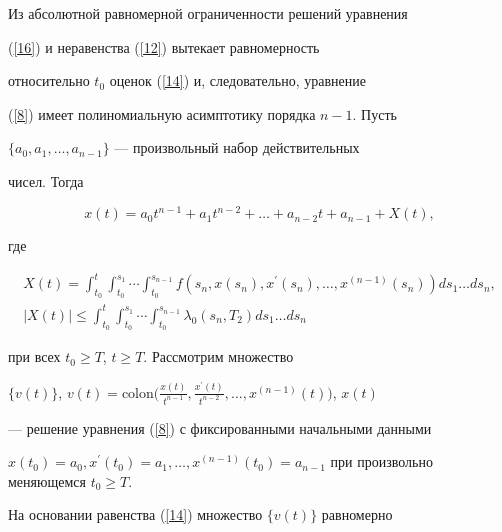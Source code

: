 \begin{pf}


Из абсолютной равномерной ограниченности решений уравнения


(\ref{16}) и неравенства (\ref{12}) вытекает равномерность


относительно $t_{0}$ оценок (\ref{14}) и, следовательно, уравнение


(\ref{8}) имеет полиномиальную асимптотику порядка $n-1$. Пусть


$\{a_{0},a_{1},\dotsc,a_{n-1}\}$ --- произвольный набор действительных


чисел. Тогда


\begin{equation}


\label{17}


{x(t)=a_{0}t^{n-1}+a_{1}t^{n-2}+\dotsc+a_{n-2}t+a_{n-1}+} X(t),


\end{equation}


где


\begin{gather*}


X(t)= \int_{t_{0}}^{t}\int_{t_{0}}^{s_{1}}\dotsb


\int_{t_{0}}^{s_{n-


1}}f(s_{n},x(s_{n}),x^{\prime}(s_{n}),\dotsc, x^{(n-


1)}(s_{n}))ds_{1}\dotsc ds_{n}, \\


%


|X(t)|\le \int_{t_{0}}^{t}\int_{t_{0}}^{s_{1}}\dotsb


\int_{t_{0}}^{s_{n-1}}


\lambda_{0}(s_{n},T_{2})ds_{1}\dotsc ds_{n}


\end{gather*}


при всех $t_{0}\geq T$, $t\geq T$. Рассмотрим множество


$\{v(t)\}$, $v(t)=\mathrm{colon}\big (\frac{x(t)}{t^{n-


1}},\frac{x^{\prime}(t)}{t^{n-2}}, \dotsc,x^{(n- 1)}(t)\big)$, $x(t)$


--- решение уравнения (\ref{8}) с фиксированными начальными данными


$x(t_{0})=a_{0}, x^{\prime}(t_{0})=a_{1},\dotsc,


x^{(n-1)}(t_{0})=a_{n-1}$ при произвольно меняющемся $t_{0}\geq T$.


На основании равенства (\ref{14}) множество $\{v(t)\}$ равномерно



\end{pf}
